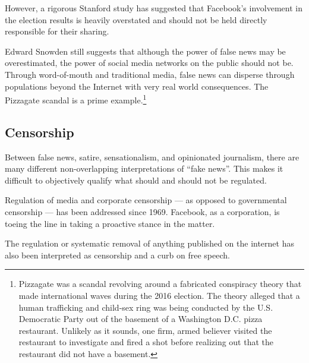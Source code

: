 \par However, a rigorous Stanford study has suggested that Facebook's involvement in the election results is heavily overstated and should not be held directly responsible for their sharing. \cite{stanford_election}

\par Edward Snowden still suggests that although the power of false news may be overestimated, the power of social media networks on the public should not be. \cite{tc_snowden} Through word-of-mouth and traditional media, false news can disperse through populations beyond the Internet with very real world consequences. The Pizzagate scandal is a prime example.\footnote{Pizzagate was a scandal revolving around a fabricated conspiracy theory that made international waves during the 2016 election. The theory alleged that a human trafficking and child-sex ring was being conducted by the U.S. Democratic Party out of the basement of a Washington D.C. pizza restaurant. Unlikely as it sounds, one firm, armed believer visited the restaurant to investigate and fired a shot before realizing out that the restaurant did not have a basement.\cite{ny_pizzagate}} \cite{cbs_fn}

\vfill

\subsection{Censorship}

\par Between false news, satire, sensationalism, and opinionated journalism, there are many different non-overlapping interpretations of ``fake news''. \cite{npr_fn} This makes it difficult to objectively qualify what should and should not be regulated.

\par Regulation of media and corporate censorship --- as opposed to governmental censorship --- has been addressed since 1969. \cite{silent_screen} Facebook, as a corporation, is toeing the line in taking a proactive stance in the matter.

\par The regulation or systematic removal of anything published on the internet has also been interpreted as censorship and a curb on free speech. \cite{eff_bill}


